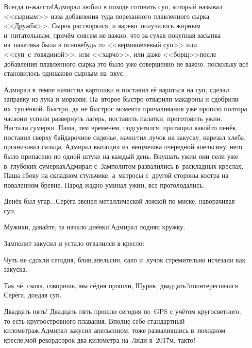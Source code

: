 \diagdash Всегда п-жалста!\mdash Адмирал любил в походе готовить суп, который называл <<сырным>> из\sdash за добавления туда порезанного плавленного сырка <<Дружба>>. Сырок растворялся, и варево~получалось жирным и~питательным, причём совсем не важно, что за сухая покупная засыпка из~пакетика была в основе\mdash будь то <<вермишелевый суп>> или <<суп~с~говядиной>>, или <<харчо>>, или даже <<борщ>>\mdash после добавления плавленного сырка это было уже совершенно не важно, поскольку всё становилось одинаково сырным на~вкус.

Адмирал в темпе начистил картошки и поставил её вариться на суп, сделал заправку из лука и моркови. На~второе быстро отварили макароны и сдобрили их~тушёнкой. Быстро, да не быстро\mdash с момента причаливания уже прошло полтора часа\mdash они успели развернуть лагерь, поставить палатки, приготовить ужин. Настали сумерки. Паша, тем временем, подсуетился, притащил какой\sdash то пенёк, поставил сверху байдарочное сиденье, начистил лучок на закуску, нарезал хлеба, организовал сальца. Адмирал вытащил из~вещмешка очередной апельсин\mdash у~него было припасено по одной штуке на каждый день. Вкушать ужин они сели уже в~глубоких сумерках\mdash Адмирал с~Замполитом развалились в~раскладных креслах, Паша сбоку на складном стульчике, а~матросы с~другой стороны костра на поваленном бревне. Народ жадно уминал ужин, все проголодались.

\diagdash Денёк был угар$\ldots$\mdash Серёга звенел металлической ложкой по миске, наворачивая суп.%

\diagdash Мужики, давайте, за начало днёвки!\mdash Адмирал поднял кружку.


Замполит закусил и устало отвалился в кресло:

\diagdash Чуть не сдохли сегодня, блин.\mdash апельсин, сало и~лучок стремительно исчезали как закуска.

\diagdash Так чё, скока, говоришь, мы сёдня прошли, Шурик, двадцать?\mdash поинтересовался Серёга, доедая суп.

\diagdash Двадцать пять! Двадцать пять прошли сегодня по~GPS с учётом кругосветного, то есть кругоостровного плавания. Вполне себе стандартный километраж,\mdash Адмирал закусил апельсином, тоже развалившись в~походном кресле,\mdash мой рекорд\mdash сорок два километра на~Лиди в~2017\sdash м, так\sdash то!

